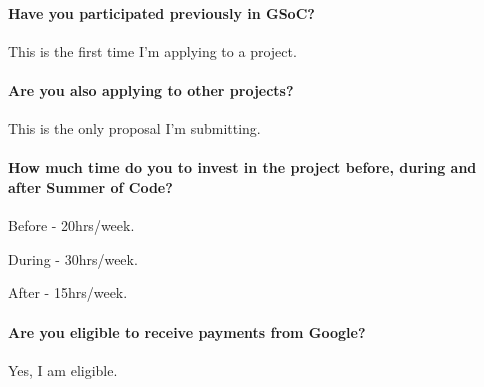       
\paragraph*{Have you participated previously in GSoC? \\} \vspace*{-0.2cm}
    \vspace*{0.1cm}
    This is the first time I'm applying to a project.
\paragraph*{Are you also applying to other projects? \\} \vspace*{-0.2cm}
    \vspace*{0.1cm}
    This is the only proposal I'm submitting.
\paragraph*{How much time do you to invest in the project before, during and after Summer of Code? \\} \vspace*{-0.2cm}
    \vspace*{0.1cm}
    \begin{focus}
        \item Before - 20hrs/week.
        \item During - 30hrs/week.
        \item After - 15hrs/week.
    \end{focus}

\paragraph*{Are you eligible to receive payments from Google? \\} \vspace*{-0.2cm}
    \vspace*{0.1cm}
    Yes, I am eligible.
